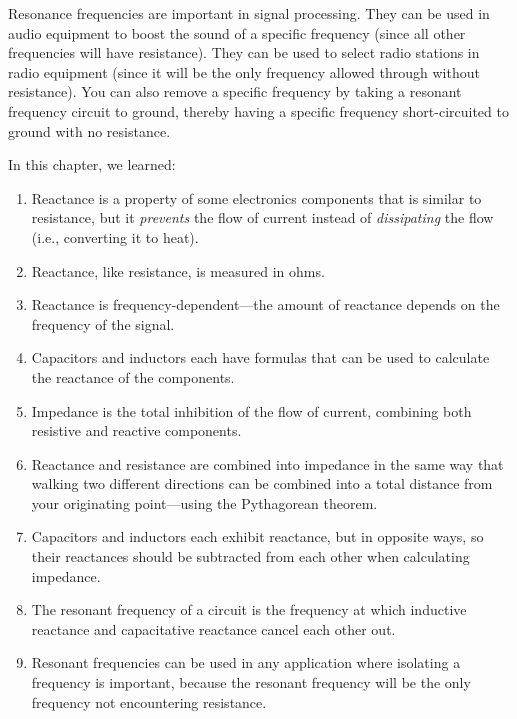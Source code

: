 Resonance frequencies are important in signal processing.
They can be used in audio equipment to boost the sound of a specific frequency (since all other frequencies will have resistance).
They can be used to select radio stations in radio equipment (since it will be the only frequency allowed through without resistance).
You can also remove a specific frequency by taking a resonant frequency circuit to ground, thereby having a specific frequency short-circuited to ground with no resistance.

\reviewsection

In this chapter, we learned:

\begin{enumerate}
\item Reactance is a property of some electronics components that is similar to resistance, but it \emph{prevents} the flow of current instead of \emph{dissipating} the flow (i.e., converting it to heat).
\item Reactance, like resistance, is measured in ohms.
\item Reactance is frequency-dependent---the amount of reactance depends on the frequency of the signal.
\item Capacitors and inductors each have formulas that can be used to calculate the reactance of the components.
\item Impedance is the total inhibition of the flow of current, combining both resistive and reactive components.
\item Reactance and resistance are combined into impedance in the same way that walking two different directions can be combined into a total distance from your originating point---using the Pythagorean theorem.
\item Capacitors and inductors each exhibit reactance, but in opposite ways, so their reactances should be subtracted from each other when calculating impedance.
\item The resonant frequency of a circuit is the frequency at which inductive reactance and capacitative reactance cancel each other out.
\item Resonant frequencies can be used in any application where isolating a frequency is important, because the resonant frequency will be the only frequency not encountering resistance.
\end{enumerate}

\exercisesection

